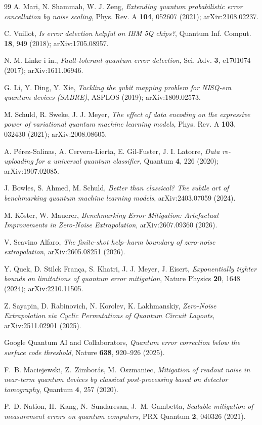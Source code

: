 \documentclass[11pt]{article}
\begin{document}
\begin{thebibliography}{99}
A. Mari, N. Shammah, W. J. Zeng, \emph{Extending quantum probabilistic error cancellation
by noise scaling}, Phys. Rev. A \textbf{104}, 052607 (2021); arXiv:2108.02237.

C. Vuillot, \emph{Is error detection helpful on IBM 5Q chips?}, Quantum Inf. Comput.
\textbf{18}, 949 (2018); arXiv:1705.08957.

N. M. Linke i in., \emph{Fault-tolerant quantum error detection}, Sci. Adv. \textbf{3},
e1701074 (2017); arXiv:1611.06946.

G. Li, Y. Ding, Y. Xie, \emph{Tackling the qubit mapping problem for NISQ-era quantum
devices (SABRE)}, ASPLOS (2019); arXiv:1809.02573.

M. Schuld, R. Sweke, J. J. Meyer, \emph{The effect of data encoding on the expressive
power of variational quantum machine learning models}, Phys. Rev. A \textbf{103},
032430 (2021); arXiv:2008.08605.

A. Pérez-Salinas, A. Cervera-Lierta, E. Gil-Fuster, J. I. Latorre, \emph{Data re-uploading for
a universal quantum classifier}, Quantum \textbf{4}, 226 (2020); arXiv:1907.02085.

J. Bowles, S. Ahmed, M. Schuld, \emph{Better than classical? The subtle art of
benchmarking quantum machine learning models}, arXiv:2403.07059 (2024).

M. Köster, W. Mauerer, \emph{Benchmarking Error Mitigation: Artefactual Improvements in
Zero-Noise Extrapolation}, arXiv:2607.09360 (2026).

V. Scavino Alfaro, \emph{The finite-shot help--harm boundary of zero-noise extrapolation},
arXiv:2605.08251 (2026).

Y. Quek, D. Stilck França, S. Khatri, J. J. Meyer, J. Eisert, \emph{Exponentially tighter
bounds on limitations of quantum error mitigation}, Nature Physics \textbf{20}, 1648 (2024);
arXiv:2210.11505.

Z. Sayapin, D. Rabinovich, N. Korolev, K. Lakhmanskiy, \emph{Zero-Noise Extrapolation via
Cyclic Permutations of Quantum Circuit Layouts}, arXiv:2511.02901 (2025).

Google Quantum AI and Collaborators, \emph{Quantum error correction below the surface code
threshold}, Nature \textbf{638}, 920--926 (2025).

F.~B. Maciejewski, Z.~Zimborás, M.~Oszmaniec, \emph{Mitigation of readout noise in near-term
quantum devices by classical post-processing based on detector tomography},
Quantum \textbf{4}, 257 (2020).

P.~D. Nation, H.~Kang, N.~Sundaresan, J.~M. Gambetta, \emph{Scalable mitigation of measurement
errors on quantum computers}, PRX Quantum \textbf{2}, 040326 (2021).

\end{thebibliography}
\end{document}
